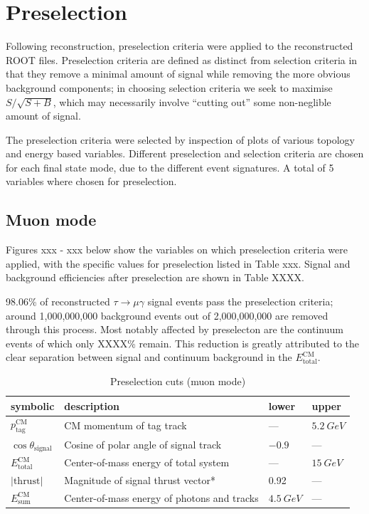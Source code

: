 \documentclass[12pt]{thesis}  %
\begin{document}
\pagebreak


\chapter{Preselection}

Following reconstruction, preselection criteria were applied to the reconstructed ROOT files. Preselection criteria are defined as distinct from selection criteria in that they remove a minimal amount of signal while removing the more obvious background components; in choosing selection criteria we seek to maximise $S/\sqrt{S+B}$, which may necessarily involve ``cutting out'' some non-neglible amount of signal.

The preselection criteria were selected by inspection of plots of various topology and energy based variables. Different preselection and selection criteria are chosen for each final state mode, due to the different event signatures. A total of 5 variables where chosen for preselection.

\section{Muon mode}

Figures xxx - xxx below show the variables on which preselection criteria were applied, with the specific values for preselection listed in Table xxx. Signal and background efficiencies after preselection are shown in Table XXXX.

98.06\% of reconstructed $\tau\to\mu\gamma$ signal events pass the preselection criteria; around 1,000,000,000 background events out of 2,000,000,000 are removed through this process. Most notably affected by preselecton are the continuum events of which only XXXX\% remain. This reduction is greatly attributed to the clear separation between signal and continuum background in the $E^{\text{CM}}_{\text{total}}$.

\begin{table}[h]
\centering
\begin{tabular}{llll}
\textbf{symbolic} & \textbf{description} & \textbf{lower} & \textbf{upper} \\ \hline
$p_{\text{tag}}^{\text{CM}}$  & CM momentum of tag track & --- & $\SI{5.2}{GeV}$ \\
$\cos\theta_{\text{signal}}$ & Cosine of polar angle of signal track & $-0.9$ & --- \\
$E_{\text{total}}^{\text{CM}}$ & Center-of-mass energy of total system  & --- & $\SI{15}{GeV}$ \\
$\lvert\text{thrust}\rvert$ & Magnitude of signal thrust vector* & 0.92 & --- \\
$E_{\text{sum}}^{\text{CM}}$ & Center-of-mass energy of photons and tracks & $\SI{4.5}{GeV}$ & ---
\end{tabular}
\caption{Preselection cuts (muon mode)}
\label{my-label}
\end{table}
\end{document}
